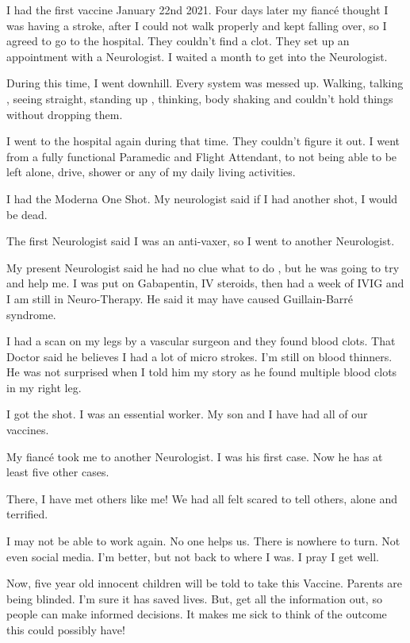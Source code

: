 I had the first vaccine January 22nd 2021. Four days later my fiancé thought I
was having a stroke, after I could not walk properly and kept falling over, so I
agreed to go to the hospital. They couldn’t find a clot. They set up an
appointment with a Neurologist. I waited a month to get into the Neurologist.

During this time, I went downhill. Every system was messed up. Walking, talking
, seeing straight, standing up , thinking, body shaking and couldn’t hold things
without dropping them.

I went to the hospital again during that time. They couldn’t figure it out. I
went from a fully functional Paramedic and Flight Attendant, to not being able
to be left alone, drive, shower or any of my daily living activities.

I had the Moderna One Shot. My neurologist said if I had another shot, I would
be dead.

The first Neurologist said I was an anti-vaxer, so I went to another
Neurologist.

My present Neurologist said he had no clue what to do , but he was going to try
and help me. I was put on Gabapentin, IV steroids, then had a week of IVIG and I
am still in Neuro-Therapy. He said it may have caused Guillain-Barré syndrome.

I had a scan on my legs by a vascular surgeon and they found blood clots. That
Doctor said he believes I had a lot of micro strokes. I’m still on blood
thinners. He was not surprised when I told him my story as he found multiple
blood clots in my right leg.

I got the shot. I was an essential worker. My son and I have had all of our
vaccines.

My fiancé took me to another Neurologist. I was his first case. Now he has at
least five other cases.

There, I have met others like me! We had all felt scared to tell others, alone
and terrified.

I may not be able to work again. No one helps us. There is nowhere to turn. Not
even social media. I’m better, but not back to where I was. I pray I get well.

Now, five year old innocent children will be told to take this Vaccine. Parents
are being blinded. I’m sure it has saved lives. But, get all the information
out, so people can make informed decisions. It makes me sick to think of the
outcome this could possibly have!
